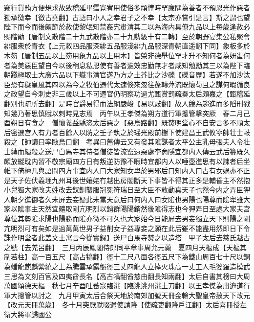 竊行貨賄方便規求故致稽延畢霑寛宥用使俗多頑悖時罕廉隅為善者不預恩光作惡者獨承徼幸【徼古堯翻】古語曰小人之幸君子之不幸【太宗亦嘗引是言】斯之謂也望陛下而今而後頗節於赦使黎氓知禁姦宄肅清其二以為海内具僚九品以上每歲逢赦必賜階勛【唐制文散階二十九武散階亦二十九勲級十有二轉】至於朝野宴集公私聚會緋服衆於青衣【上元敕四品服深緋五品服淺緋九品服深青朝直遥翻下同】象板多於木笏【唐制五品以上笏用象九品以上用木】皆榮非德舉位罕才升不知何者為妍蚩何者為美惡臣望自今以後稍息私恩使有善者逾效忠勤無才者咸知勉勵其三以為陛下臨朝踐極取士大廣六品以下軄事清官遂乃方之土芥比之沙礫【礫音歷】若遂不加沙汰臣恐有穢皇風其四以為今之牧伯遷代太速倏來忽往蓬轉萍流既懷苟且之謀何暇循良之政望自今刺史非三歲以上不可遷官仍明察功過尤甄賞罰疏奏太后頗嘉之【甄稽延翻别也疏所去翻】是時官爵易得而法網嚴峻【易以䜴翻】故人競為趨進而多䧟刑戮知幾乃著思慎賦以刺時見志焉　丙午以王孝傑為朔方道行軍摠管撃突厥　春二月己酉朔日有食之　僧懷義益驕恣太后惡之【惡烏路翻】既焚明堂心不自安言多不順太后密選宫人有力者百餘人以防之壬子執之於瑶光殿前樹下使建昌王武攸寜帥壮士敺殺之【帥讀曰率敺烏口翻　考異曰舊傳云又有發其隂謀者太平公主乳母張夫人令壮士縳而縊殺之送尸白馬寺其侍者僧徒皆流竄遠惡處李啇隱宜都内人傳云武后簒既久頗放縱耽内習不敬宗廟四方日有叛逆防豫不暇時宜都内人以唾壺進思有以諫者后坐帷下倚檀几與語問四方事宜内人曰大家知女卑於男邪后曰知内人曰古有女媧亦不正是天子佐伏羲理九州耳後世孃姥冇越出房閤斷天下事皆不得其正多是輔昏主不然抱小兒獨大家改夫姓改去釵釧襲服冠冕符瑞日至大臣不敢動真天子也然今内之弄臣狎人朝夕進御者久未屏去妾疑此未當天意后曰何内人曰女隂也男陽也陽尊而隂卑雖大家以隂事主天然宜體取剛亢明烈以銷群陽陽銷然後隂得志也今狎弄日至處大家夫宫尊位其勢隂求陽也陽勝而隂亦微不可久也大家始今日能屛去男妾獨立天下則陽之剛亢明烈可有矣如是過萬萬世男子益削女子益專妾之願在此后雖不能盡用然即日下令誅作明堂者此盖文士寓言今從實録】送尸白馬寺焚之以造塔　甲子太后去慈氏越古之號【去羌呂翻】　三月丙辰鳳閣侍郎同平章事周允元薨　夏四月天樞成【天樞其制若柱】高一百五尺【高占犒翻】徑十二尺八面各徑五尺下為鐵山周百七十尺以銅為蟠龍麒麟縈繞之上為騰雲承露盤徑三丈四龍人立捧火珠高一丈工人毛婆羅造模武三思為文刻百官及四夷酋長名【高古犒翻酋慈由翻長知兩翻】太后自書其榜曰大周萬國頌德天樞　秋七月辛酉吐蕃寇臨洮【臨洮洮州洮土刀翻】以王孝傑為肅邉道行軍大摠管以討之　九月甲寅太后合祭天地於南郊加號天冊金輪大聖皇帝赦天下改元【改元天冊萬歲】　冬十月突厥默啜遣使請降【使疏吏翻降戶江翻】太后喜冊授左衛大將軍歸國公


